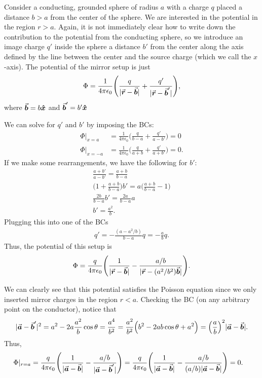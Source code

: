 Consider a conducting, grounded sphere of radius $a$ with a charge $q$ placed a distance $b > a$ from the center of the sphere.
We are interested in the potential in the region $r > a$.
Again, it is not immediately clear how to write down the contribution to the potential from the conducting sphere, so we introduce an image charge $q'$ inside the sphere a distance $b'$ from the center along the axis defined by the line between the center and the source charge (which we call the $x$-axis).
The potential of the mirror setup is just
\begin{eqnarray}
    \Phi = \frac{1}{4 \pi \epsilon_0} \Bigg( \frac{q}{|\va*{r} - \va*{b}|} + \frac{q'}{|\va*{r} - \va*{b}'|} \Bigg)
,\end{eqnarray}
where $\va*{b} = b \vu*{x}$ and $\va*{b}' = b' \vu*{x}$

We can solve for $q'$ and $b'$ by imposing the BCs:
\begin{align}
    \Phi|_{x = a} &= \frac{1}{4 \pi \epsilon_0} \Big( \frac{q}{b - a} + \frac{q'}{a - b'} \Big) = 0 \\
    \Phi|_{x = -a} &= \frac{1}{4 \pi \epsilon_0} \Big( \frac{q}{a + b} + \frac{q'}{a + b'} \Big) = 0
.\end{align}
If we make some rearrangements, we have the following for $b'$:
\begin{gather}
    \frac{a + b'}{a - b'} = \frac{a + b}{b - a} \nonumber \\
    \Big( 1 + \frac{a + b}{b - a} \Big) b' = a \Big( \frac{a + b}{b - a} - 1 \Big) \nonumber \\
    \frac{2b}{b - a} b' = \frac{2a}{b - a} a \nonumber \\
    b' = \frac{a^2}{b}
.\end{gather}
Plugging this into one of the BCs
\begin{eqnarray}
    q' = -\frac{(a - a^2/b)}{b-a} q = -\frac{a}{b} q
.\end{eqnarray}
Thus, the potential of this setup is
\begin{align}
    \Phi = \frac{q}{4 \pi \epsilon_0} \Bigg( \frac{1}{|\va*{r} - \va*{b}|} - \frac{a/b}{|\va*{r} - (a^2/b^2)\va*{b}|} \Bigg)
.\end{align}

We can clearly see that this potential satisfies the Poisson equation since we only inserted mirror charges in the region $r < a$.
Checking the BC (on any arbitrary point on the conductor), notice that 
\begin{align}
    |\va*{a} - \va*{b}'|^2 = a^2 - 2a \frac{a^2}{b} \cos{\theta} = \frac{a^{4}}{b^2} = \frac{a^2}{b^2} \Big( b^2 - 2ab \cos{\theta} + a^2 \Big) = \Big( \frac{a}{b} \Big)^2 |\va*{a} - \va*{b}|
.\end{align}
Thus,
\begin{align}
    \Phi|_{r = a} &= \frac{q}{4 \pi \epsilon_0} \Bigg( \frac{1}{|\va*{a} - \va*{b}|} - \frac{a/b}{|\va*{a} - \va*{b}'|} \Bigg) = \frac{q}{4 \pi \epsilon_0} \Bigg( \frac{1}{|\va*{a} - \va*{b}|} - \frac{a/b}{(a/b)|\va*{a} - \va*{b}|} \Bigg) = 0
.\end{align}


